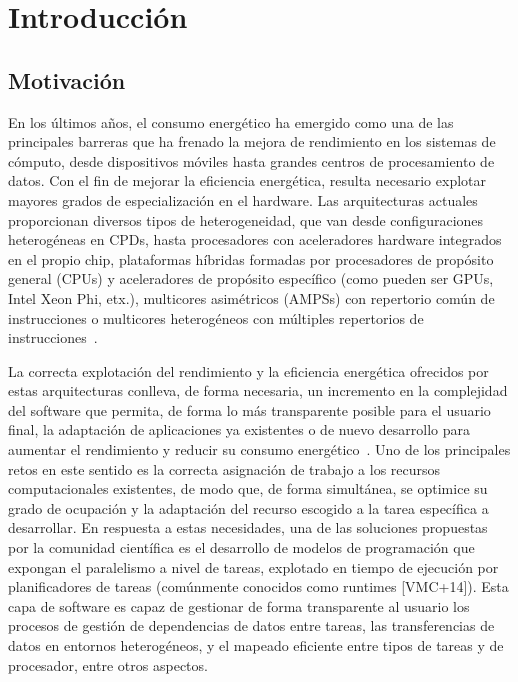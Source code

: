 \cleardoublepage


\chapter{Introducción}
\label{ch:chapter1}

\section{Motivación}
En los últimos años, el consumo energético ha emergido como una de las
principales barreras que ha frenado la mejora de rendimiento en los
sistemas de cómputo, desde dispositivos móviles hasta grandes centros de
procesamiento de datos. Con el fin de mejorar la eficiencia energética,
resulta necesario explotar mayores grados de especialización en el
hardware. Las arquitecturas actuales proporcionan diversos tipos de
heterogeneidad, que van desde configuraciones heterogéneas en CPDs, hasta
procesadores con aceleradores hardware integrados en el propio chip,
plataformas híbridas formadas por procesadores de propósito general (CPUs)
y aceleradores de propósito específico (como pueden ser GPUs, Intel Xeon
Phi, etx.), multicores asimétricos (AMPSs) con repertorio común de
instrucciones o multicores heterogéneos con múltiples repertorios de
instrucciones~\cite{FuMi11,KoSh13}.

La correcta explotación del rendimiento y la eficiencia energética
ofrecidos por estas arquitecturas conlleva, de forma necesaria, un
incremento en la complejidad del software que permita, de forma lo más
transparente posible para el usuario final, la adaptación de aplicaciones
ya existentes o de nuevo desarrollo para aumentar el rendimiento y reducir
su consumo energético~\cite{OsTo10,SKC+15}. Uno de los principales retos en
este sentido es la correcta asignación de trabajo a los recursos
computacionales existentes, de modo que, de forma simultánea, se optimice
su grado de ocupación y la adaptación del recurso escogido a la tarea
específica a desarrollar. En respuesta a estas necesidades, una de las
soluciones propuestas por la comunidad científica es el desarrollo de
modelos de programación que expongan el paralelismo a nivel de tareas,
explotado en tiempo de ejecución por planificadores de tareas (comúnmente
conocidos como runtimes [VMC+14]). Esta capa de software es capaz de
gestionar de forma transparente al usuario los procesos de gestión de
dependencias de datos entre tareas, las transferencias de datos en entornos
heterogéneos, y el mapeado eficiente entre tipos de tareas y de procesador,
entre otros aspectos.

